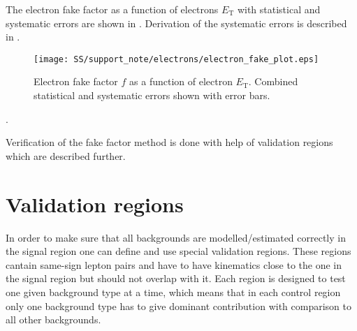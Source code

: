 The electron fake factor as a function of electrons $E_\mathrm{T}$ with statistical and systematic errors are
shown in . Derivation of the systematic errors is described in .
\begin{figure}[h]
\begin{center}
\texttt{[image: SS/support\_note/electrons/electron\_fake\_plot.eps]}
\caption{Electron fake factor $f$ as a function of electron $E_\mathrm{T}$. Combined statistical and systematic errors shown with error bars.}
\label{fig:ff_e_errs}
\end{center}
\end{figure} 
.

Verification of the fake factor method is done with help of validation regions which are described further.




\section{Validation regions}

In order to make sure that all backgrounds are modelled/estimated correctly in the signal region one can define and use special validation regions.
These regions cantain same-sign lepton pairs and have to have kinematics close to the one in the signal region but should not overlap with it. 
Each region is designed to test one given background type at a time,
which means that in each control region only one background type has to give dominant contribution with comparison to all other backgrounds.


